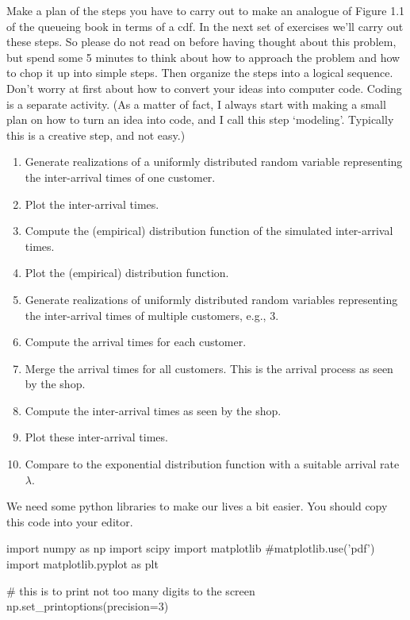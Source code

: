 \begin{exercise}
  Make a plan of the steps you have to carry out to make an analogue of Figure 1.1 of the queueing book in terms of a cdf.
  In the next set of exercises we'll carry out these steps.
  So please do not read on before having thought about this problem, but spend some 5 minutes to think about how to approach the problem and how to chop it up into simple steps.
  Then organize the steps into a logical sequence.
  Don't worry at first about how to convert your ideas into computer code.
  Coding is a separate activity.
  (As a matter of fact, I always start with making a small plan on how to turn an idea into code, and I call this step `modeling'.
  Typically this is a creative step, and not easy.)

  \begin{solution}
    \begin{enumerate}
    \item Generate realizations of a uniformly distributed random variable representing the inter-arrival times of one customer.
    \item Plot the inter-arrival times.
    \item Compute the (empirical) distribution function of the simulated inter-arrival times.
    \item Plot the (empirical) distribution function.
    \item Generate realizations of uniformly distributed random variables representing the inter-arrival times of multiple customers, e.g., 3. 
    \item Compute the arrival times for each customer.
    \item Merge  the arrival times for all customers. This is the arrival process as seen by the shop.
    \item Compute the inter-arrival times as seen by the shop.
    \item Plot these inter-arrival times.
    \item Compare to the exponential distribution function with a suitable arrival rate $\lambda$. 
    \end{enumerate}
  \end{solution}
\end{exercise}

We need some python libraries to make our lives a bit easier. You should copy this code into your editor.

\begin{pyverbatim}
import numpy as np
import scipy
import matplotlib
#matplotlib.use('pdf') 
import matplotlib.pyplot as plt

# this is to print not too many digits to the screen
np.set_printoptions(precision=3) 
\end{pyverbatim}


